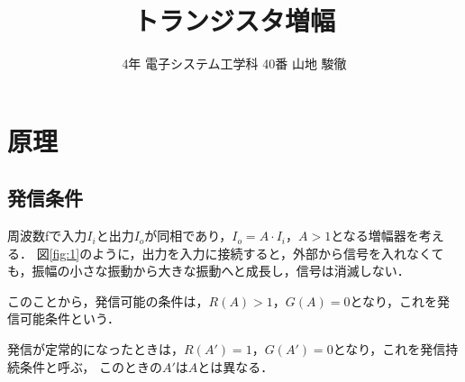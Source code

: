 \documentclass[10pt, a4j, dvipdfmx]{jarticle}
\title{トランジスタ増幅}
\author{4年 電子システム工学科 40番  山地 駿徹}
\begin{document}
    \section{原理}
    \subsection*{発信条件}
    周波数fで入力$I_i$と出力$I_o$が同相であり，$I_o = A \cdot I_i$，$A > 1$となる増幅器を考える．
    図\ref{fig:1}のように，出力を入力に接続すると，外部から信号を入れなくても，振幅の小さな振動から大きな振動へと成長し，信号は消滅しない．

    このことから，発信可能の条件は，$R(A) > 1$，$G(A) = 0$となり，これを発信可能条件という．

    発信が定常的になったときは，$R(A') = 1$，$G(A') =0$となり，これを発信持続条件と呼ぶ，
    このときの$A'$は$A$とは異なる．
\end{document}
